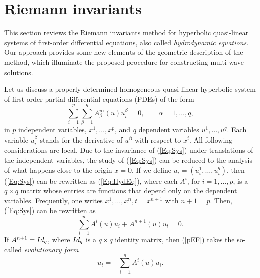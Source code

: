 \documentclass{birkjour}
\theoremstyle{definition}
\theoremstyle{remark}
\numberwithin{equation}{section}
\numberwithin{equation}{section}
\numberwithin{thm}{section}
\numberwithin{equation}{section}
\numberwithin{thm}{section}
\begin{document}
\section{Riemann invariants}\label{Se:RI}
This section reviews the Riemann invariants method for hyperbolic quasi-linear systems of first-order differential equations, also called {\it hydrodynamic equations}. Our approach provides some new elements of the geometric description of the method, which illuminate the proposed procedure for constructing multi-wave solutions.

Let us discuss a properly determined homogeneous quasi-linear hyperbolic system   of first-order partial differential equations (PDEs) of the form
\begin{equation}\label{Eq:Sys}
	\sum_{i=1}^p\sum_{\beta=1}^qA^{i\alpha}_\beta (u)u^\beta_i=0,\qquad \alpha=1,\ldots,q,
\end{equation}
in $p$ independent variables, $x^1,\ldots,x^p$, and $q$ dependent variables $u^1,\ldots,u^q$. Each variable $u^\beta_i$ stands for the derivative of $u^\beta$ with respect to $x^i$. All following considerations are local. Due to the invariance of (\ref{Eq:Sys}) under translations of the independent variables,  the study of (\ref{Eq:Sys}) can be reduced to the analysis of what happens close to the origin $x=0$. If we define $u_i=(u^1_i,\ldots,u_i^q)$, then (\ref{Eq:Sys}) can be rewritten as (\ref{Eq:HydEq}), where each $A^i$, for $i=1,\ldots,p$, is  a $q\times q$ matrix whose entries are functions that depend only on the dependent variables. Frequently, one writes $x^1,\ldots,x^n,t=x^{n+1}$ with $n+1=p$. Then, (\ref{Eq:Sys}) can be rewritten as 
\begin{equation}\label{pEF}
	\sum_{i=1}^nA^i(u)u_i+A^{n+1}(u)u_t=0.
\end{equation}
If $A^{n+1}={\rm Id}_{q}$, where ${\rm Id}_q$ is a $q\times q$ identity matrix,  then (\ref{pEF}) takes the so-called {\it evolutionary form}
\begin{equation}\label{Eq:bezx}
	u_t=-\sum_{i=1}^nA^i(u)u_i.
\end{equation}
\end{document}
